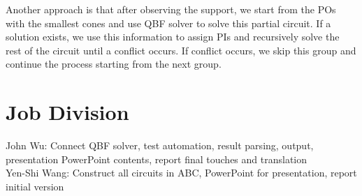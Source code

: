 Another approach is that after observing the support, we start from the POs with the smallest cones and use QBF solver to solve this partial circuit. If a solution exists, we use this information to assign PIs and recursively solve the rest of the circuit until a conflict occurs. If conflict occurs, we skip this group and continue the process starting from the next group.

\section{Job Division}
John Wu: Connect QBF solver, test automation, result parsing, output, presentation PowerPoint contents, report final touches and translation\\

Yen-Shi Wang: Construct all circuits in ABC, PowerPoint for presentation, report initial version \\

